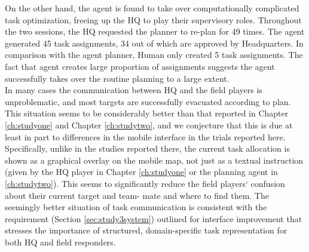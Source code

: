 
On the other hand, the agent is found to take over computationally complicated task optimization, freeing up the HQ to play their supervisory roles. Throughout the two sessions, the HQ requested the planner to re-plan for 49 times. The agent generated 45 task assignments, 34 out of which are approved by Headquarters. In comparison with the agent planner, Human only created 5 task assignments. The fact that agent creates large proportion of assignments suggests the agent successfully takes over the routine planning to a large extent. \\

In many cases the communication between HQ and the field players is unproblematic, and most targets are successfully evacuated according to plan. This situation seems to be considerably better than that reported in Chapter \ref{ch:studyone} and Chapter \ref{ch:studytwo}, and we conjecture that this is due at least in part to differences in the mobile interface in the trials reported here. Specifically, unlike in the studies reported there, the current task allocation is shown as a graphical overlay on the mobile map, not just as a textual instruction (given by the HQ player in Chapter \ref{ch:studyone} or the planning agent in \ref{ch:studytwo}). This seems to significantly reduce the field players` confusion about their current target and team- mate and where to find them. The seemingly better situation of task communication is consistent with the requirement (Section \ref{sec:study3system}) outlined for interface improvement that stresses the importance of structured, domain-specific task representation for both HQ and field responders.  \\

